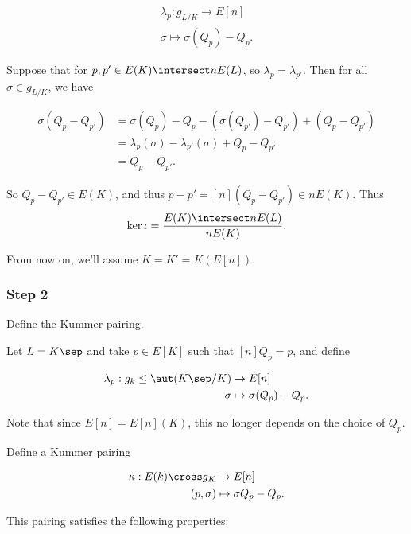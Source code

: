 \begin{align*}
  \lambda_p : g_{L/K} \to E[n] \\
  \sigma \mapsto \sigma(Q_p) - Q_p
  .\end{align*}

Suppose that for \(p, p' \in E(K) \intersect n E(L)\), so
\(\lambda_p = \lambda_{p'}\). Then for all \(\sigma \in g_{L/K}\), we
have

\begin{align*}
  \sigma(Q_p - Q_{p'}) &= \sigma(Q_p) - Q_p - (\sigma(Q_{p'}) - Q_{p'} ) + (Q_p - Q_{p'}) \\
  &= \lambda_p(\sigma) - \lambda_{p'}(\sigma) + Q_p - Q_{p'} \\
  &= Q_p - Q_{p'}
  .\end{align*}

So \(Q_p - Q_{p'} \in E(K)\), and thus
\(p - p' = [n] (Q_p - Q_{p'}) \in nE(K)\). Thus
\begin{align*}\ker \iota = \frac{E(K) \intersect nE(L)}{nE(K)}.\end{align*}

From now on, we'll assume \(K = K' = K(E[n])\).

\hypertarget{step-2-1}{%
\subsubsection{Step 2}\label{step-2-1}}

Define the Kummer pairing.

Let \(L = K\sep\) and take \(p \in E[K]\) such that \([n] Q_p = p\), and
define

\begin{align*}
\lambda_p : g_k \leq \aut(K\sep/K) &\to E[n] \\
\sigma &\mapsto \sigma(Q_p) - Q_p
.\end{align*}

Note that since \(E[n] = E[n](K)\), this no longer depends on the choice
of \(Q_p\).

Define a Kummer pairing

\begin{align*}
\kappa: E(k) \cross g_K &\to E[n] \\
(p, \sigma) &\mapsto \sigma Q_p - Q_p
.\end{align*}

\begin{description}
\tightlist
\item[Proposition]
This pairing satisfies the following properties:
\end{description}

